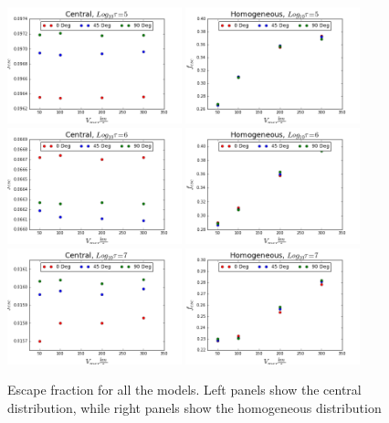 \documentclass[usenatbib]{mn2e}
\begin{document}
\begin{figure}
  \includegraphics[width=0.45\textwidth]{FECentral5.png}
  \includegraphics[width=0.45\textwidth]{FEHOM5.png}
  \includegraphics[width=0.45\textwidth]{FECentral6.png}
  \includegraphics[width=0.45\textwidth]{FEHOM6.png}
  \includegraphics[width=0.45\textwidth]{FECentral7.png}
  \includegraphics[width=0.45\textwidth]{FEHOM7.png}
  \label{figure:escape}\caption{Escape fraction for all the models. Left
    panels show the central distribution, while right panels show the
    homogeneous distribution} 
\end{figure}
\end{document}
